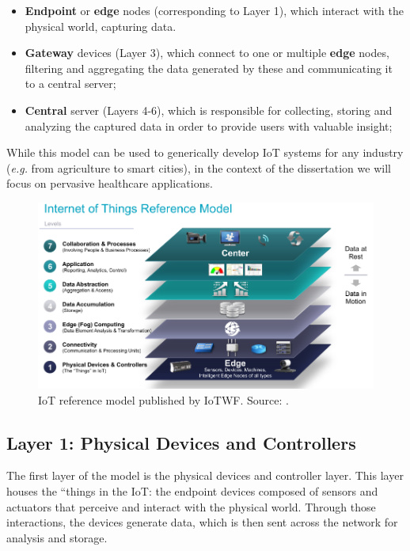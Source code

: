 \begin{itemize}
    \item \textbf{Endpoint} or \textbf{edge} nodes (corresponding to Layer 1), which interact with the physical world, capturing data.
    \item \textbf{Gateway} devices (Layer 3), which connect to one or multiple \textbf{edge} nodes, filtering and aggregating the data generated by these and communicating it to a central server; 
    \item \textbf{Central} server (Layers 4-6), which is responsible for collecting, storing and analyzing the captured data in order to provide users with valuable insight;
\end{itemize}

While this model can be used to generically develop \acs{IoT} systems for any industry (\textit{e.g.} from agriculture to smart cities), in the context of the dissertation we will focus on pervasive healthcare applications. \bigskip


\begin{figure}[H]
    \centering
    \includegraphics[width=0.85\linewidth]{images/iotwf-referencemodel.png}
    \caption[IoT reference model published by IoTWF.]{IoT reference model published by IoTWF. Source: \cite{Cisco2014}.}
    \label{fig:iotwf-referencemodel}
\end{figure}

\subsection{Layer 1: Physical Devices and Controllers}
\label{sec:iot-model-layer1}

The first layer of the model \cite{Cisco2014} is the physical devices and controller layer. This layer houses the ``things in the \acl{IoT}: the endpoint devices composed of sensors and actuators that perceive and interact with the physical world. Through those interactions, the devices generate data, which is then sent across the network for analysis and storage. \bigskip

